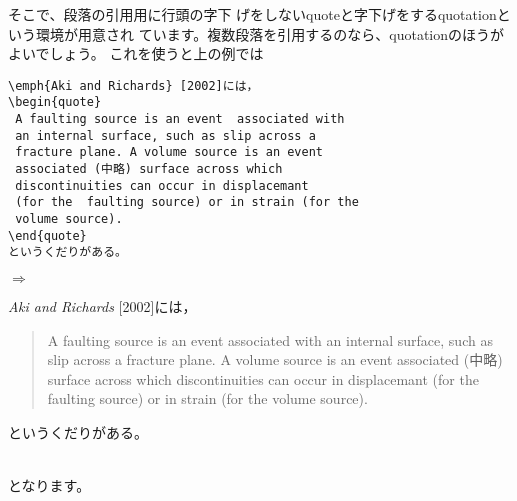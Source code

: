そこで、段落の引用用に行頭の字下
げをしないquoteと字下げをするquotationという環境が用意され
ています。複数段落を引用するのなら、quotationのほうがよいでしょう。
これを使うと上の例では\\
\begin{minipage}[c]{.50\textwidth}
\begin{screen}
\small
\begin{verbatim}
\emph{Aki and Richards} [2002]には，
\begin{quote}
 A faulting source is an event  associated with
 an internal surface, such as slip across a
 fracture plane. A volume source is an event
 associated (中略) surface across which
 discontinuities can occur in displacemant
 (for the  faulting source) or in strain (for the
 volume source).
\end{quote}
というくだりがある。
\end{verbatim}
\end{screen}
\end{minipage}%
$\Rightarrow$
\begin{minipage}{.45\textwidth}
\begin{shadebox}
\emph{Aki and Richards} [2002]には，
\begin{quote}
 A faulting source is an event  associated with
 an internal surface, such as slip across a
 fracture plane. A volume source is an event
 associated (中略) surface across which
 discontinuities can occur in displacemant
 (for the  faulting source) or in strain (for the
 volume source).
\end{quote}
というくだりがある。
\end{shadebox}
\end{minipage}
\vspace*{1mm}\\
となります。

